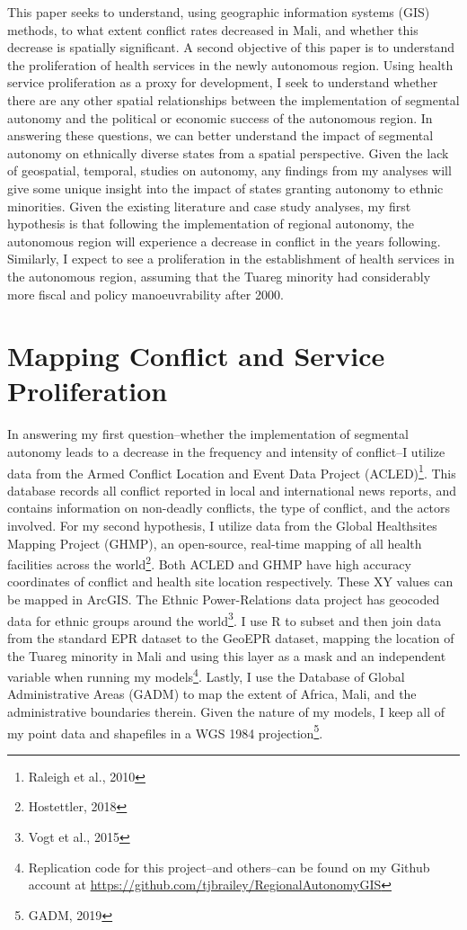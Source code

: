 \documentclass[12pt]{elsarticle}
\begin{document}
This paper seeks to understand, using geographic information systems (GIS) methods, to what extent conflict rates decreased in Mali, and whether this decrease is spatially significant. A second objective of this paper is to understand the proliferation of health services in the newly autonomous region. Using health service proliferation as a proxy for development, I seek to understand whether there are any other spatial relationships between the implementation of segmental autonomy and the political or economic success of the autonomous region. In answering these questions, we can better understand the impact of segmental autonomy on ethnically diverse states from a spatial perspective. Given the lack of geospatial, temporal, studies on autonomy, any findings from my analyses will give some unique insight into the impact of states granting autonomy to ethnic minorities. Given the existing literature and case study analyses, my first hypothesis is that following the implementation of regional autonomy, the autonomous region will experience a decrease in conflict in the years following. Similarly, I expect to see a proliferation in the establishment of health services in the autonomous region, assuming that the Tuareg minority had considerably more fiscal and policy manoeuvrability after 2000.

\section{Mapping Conflict and Service Proliferation}
In answering my first question--whether the implementation of segmental autonomy leads to a decrease in the frequency and intensity of conflict--I utilize data from the Armed Conflict Location and Event Data Project (ACLED)\footnote{Raleigh et al., 2010}. This database records all conflict reported in local and international news reports, and contains information on non-deadly conflicts, the type of conflict, and the actors involved. For my second hypothesis, I utilize data from the Global Healthsites Mapping Project (GHMP), an open-source, real-time mapping of all health facilities across the world\footnote{Hostettler, 2018}. Both ACLED and GHMP have high accuracy coordinates of conflict and health site location respectively. These XY values can be mapped in ArcGIS. The Ethnic Power-Relations data project has geocoded data for ethnic groups around the world\footnote{Vogt et al., 2015}. I use R to subset and then join data from the standard EPR dataset to the GeoEPR dataset, mapping the location of the Tuareg minority in Mali and using this layer as a mask and an independent variable when running my models\footnote{Replication code for this project--and others--can be found on my Github account at \href{https://github.com/tjbrailey/RegionalAutonomyGIS}{https://github.com/tjbrailey/RegionalAutonomyGIS}}. Lastly, I use the Database of Global Administrative Areas (GADM) to map the extent of Africa, Mali, and the administrative boundaries therein. Given the nature of my models, I keep all of my point data and shapefiles in a WGS 1984 projection\footnote{GADM, 2019}. 
\end{document}
